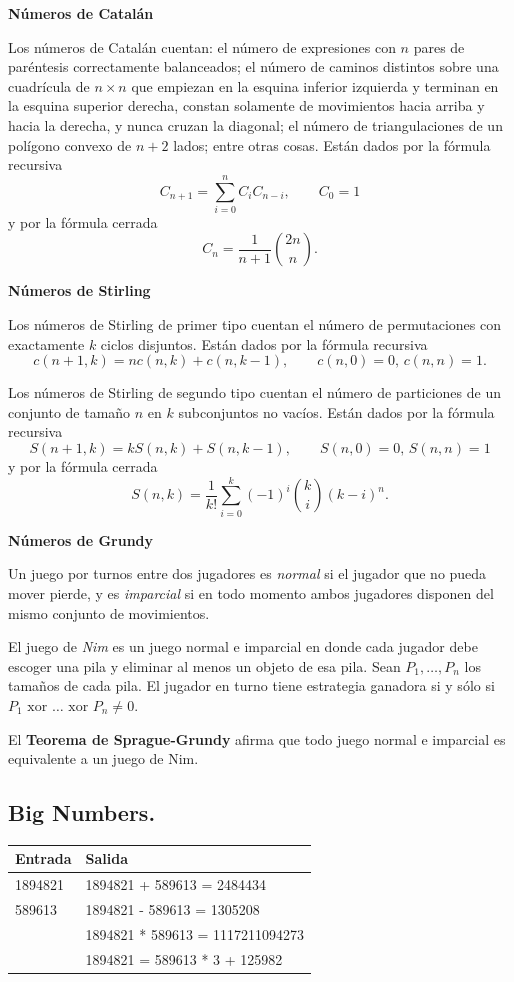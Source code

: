 \documentclass[10pt, letterpaper, twoside]{article}
\begin{document}
\textbf{Números de Catalán}

Los números de Catalán cuentan: el número de expresiones con $n$ pares de paréntesis correctamente balanceados; el número de caminos distintos sobre una cuadrícula de $n \times n$ que empiezan en la esquina inferior izquierda y terminan en la esquina superior derecha, constan solamente de movimientos hacia arriba y hacia la derecha, y nunca cruzan la diagonal; el número de triangulaciones de un polígono convexo de $n + 2$ lados; entre otras cosas. Están dados por la fórmula recursiva
$$C_{n+1} = \sum_{i=0}^n C_iC_{n-i}, \qquad C_0 = 1$$
y por la fórmula cerrada
$$C_n = \frac{1}{n + 1}\binom{2n}{n}.$$

\textbf{Números de Stirling}

Los números de Stirling de primer tipo cuentan el número de permutaciones con exactamente $k$ ciclos disjuntos. Están dados por la fórmula recursiva
$$c(n + 1, k) = nc(n, k) + c(n, k - 1), \qquad c(n, 0) =  0, \, c(n, n) = 1.$$

Los números de Stirling de segundo tipo cuentan el número de particiones de un conjunto de tamaño $n$ en $k$ subconjuntos no vacíos. Están dados por la fórmula recursiva
$$S(n + 1, k) = kS(n, k) + S(n, k - 1), \qquad S(n, 0) =  0, \, S(n, n) = 1$$
y por la fórmula cerrada
$$S(n, k) = \frac{1}{k!} \sum_{i=0}^k (-1)^i \binom{k}{i}(k - i)^n.$$

\textbf{Números de Grundy}

Un juego por turnos entre dos jugadores es \textit{normal} si el jugador que no pueda mover pierde, y es \textit{imparcial} si en todo momento ambos jugadores disponen del mismo conjunto de movimientos.

El juego de \textit{Nim} es un juego normal e imparcial en donde cada jugador debe escoger una pila y eliminar al menos un objeto de esa pila. Sean $P_1, \ldots, P_n$ los tamaños de cada pila. El jugador en turno tiene estrategia ganadora si y sólo si $P_1 \text{ xor } \ldots \text{ xor } P_n \neq 0$.

El \textbf{Teorema de Sprague-Grundy} afirma que todo juego normal e imparcial es equivalente a un juego de Nim.

\subsection{Big Numbers.}



\begin{tabular}{|p{7cm}|p{7cm}|}
\hline
\textbf{Entrada} & \textbf{Salida}\\ \hline
1894821 & 1894821 + 589613 = 2484434\\
589613  & 1894821 - 589613 = 1305208\\ 
        & 1894821 * 589613 = 1117211094273\\ 
        & 1894821 = 589613 * 3 + 125982\\ \hline
\end{tabular}\bigskip
\end{document}
